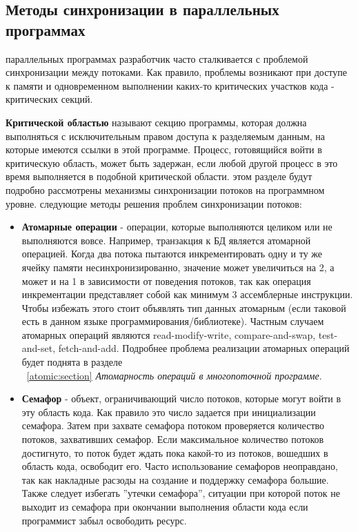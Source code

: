 { %
	\subsection{Методы синхронизации в параллельных программах}
	 параллельных программах разработчик часто сталкивается с проблемой синхронизации между потоками. Как правило, проблемы возникают при доступе к памяти и одновременном выполнении каких-то критических участков кода - критических секций.
	\par\textbf{Критической областью} называют секцию программы, которая должна выполняться с исключительным правом доступа к разделяемым данным, на которые имеются ссылки в этой программе. Процесс, готовящийся войти в критическую область, может быть задержан, если любой другой процесс в это время выполняется в подобной критической области.
	 этом разделе будут подробно рассмотрены механизмы синхронизации потоков на программном уровне.
	 следующие методы решения проблем синхронизации потоков:
		\begin{itemize}
			\item\textbf{Атомарные операции} - операции, которые выполняются целиком или не выполняются вовсе. Например, транзакция к БД является атомарной операцией. Когда два потока пытаются инкрементировать одну и ту же ячейку памяти несинхронизированно, значение может увеличиться на 2, а может и на 1 в зависимости от поведения потоков, так как операция инкрементации представляет собой как минимум 3 ассемблерные инструкции. Чтобы избежать этого стоит объявлять тип данных атомарным (если таковой есть в данном языке программирования/библиотеке). Частным случаем атомарных операций являются read-modify-write, compare-and-swap, test-and-set, fetch-and-add. Подробнее проблема реализации атомарных операций будет поднята в разделе\\~\ref{atomic:section} \textit{Атомарность операций в многопоточной программе}.
			\item\textbf{Семафор} - объект, ограничивающий число потоков, которые могут войти в эту область кода. Как правило это число задается при инициализации семафора. Затем при захвате семафора потоком проверяется количество потоков, захвативших семафор. Если максимальное количество потоков достигнуто, то поток будет ждать пока какой-то из потоков, вошедших в область кода, освободит его. Часто использование семафоров неоправдано, так как накладные расзоды на создание и поддержку семафора большие. Также следует избегать ''утечки семафора'', ситуации при которой поток не выходит из семафора при окончании выполнения области кода если программист забыл освободить ресурс.

\end{itemize}}
